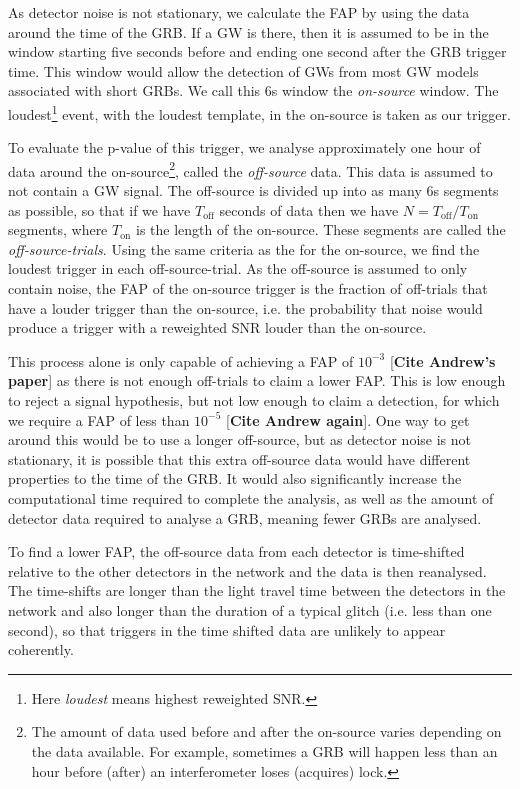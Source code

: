 \documentclass[11pt]{cuthesis}
\begin{document}
As detector noise is not stationary, we calculate the FAP by using the data around the time of the GRB. If a GW is there, then it is assumed to be in the window starting five seconds before and ending one second after the GRB trigger time. This window would allow the detection of GWs from most GW models associated with short GRBs. We call this 6s window the \textit{on-source} window. The loudest\footnote{Here \textit{loudest} means highest reweighted SNR.} event, with the loudest template, in the on-source is taken as our trigger. 

To evaluate the p-value of this trigger, we analyse approximately one hour of data around the on-source\footnote{The amount of data used before and after the on-source varies depending on the data available. For example, sometimes a GRB will happen less than an hour before (after) an interferometer loses (acquires) lock.}, called the \textit{off-source} data. This data is assumed to not contain a GW signal. The off-source is divided up into as many 6s segments as possible, so that if we have $T_\text{off}$ seconds of data then we have $N=T_\text{off} / T_\text{on}$ segments, where $T_\text{on}$ is the length of the on-source. These segments are called the \textit{off-source-trials}. Using the same criteria as the for the on-source, we find the loudest trigger in each off-source-trial. As the off-source is assumed to only contain noise, the FAP of the on-source trigger is the fraction of off-trials that have a louder trigger than the on-source, i.e. the probability that noise would produce a trigger with a reweighted SNR louder than the on-source. 

This process alone is only capable of achieving a FAP of $10^{-3}$ [\textbf{Cite Andrew's paper}] as there is not enough off-trials to claim a lower FAP. This is low enough to reject a signal hypothesis, but not low enough to claim a detection, for which we require a FAP of less than $10^{-5}$ [\textbf{Cite Andrew again}]. One way to get around this would be to use a longer off-source, but as detector noise is not stationary, it is possible that this extra off-source data would have different properties to the time of the GRB. It would also significantly increase the computational time required to complete the analysis, as well as the amount of detector data required to analyse a GRB, meaning fewer GRBs are analysed.

To find a lower FAP, the off-source data from each detector is time-shifted relative to the other detectors in the network and the data is then reanalysed. The time-shifts are longer than the light travel time between the detectors in the network and also longer than the duration of a typical glitch (i.e. less than one second), so that triggers in the time shifted data are unlikely to appear coherently.  
\end{document}
